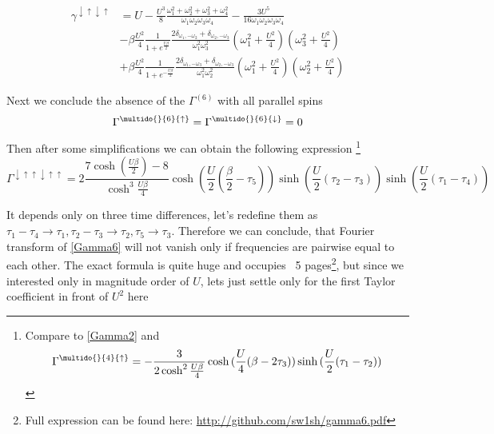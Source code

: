 \begin{equation}\begin{aligned}
 \gamma^{\downarrow\uparrow\downarrow\uparrow} & = 
 U - \frac{U^3}{8}\frac{\omega_1^2+\omega_2^2+\omega_3^2+\omega_4^2}{\omega_1\omega_2\omega_3\omega_4}
   - \frac{3U^5}{16\omega_1\omega_2\omega_3\omega_4} \\
  &- \beta\frac{U^2}{4}\frac{1}{1+e^{\frac{U\beta}{2}}}\frac{2\delta_{\omega_1,-\omega_2}+\delta_{\omega_2,-\omega_3}}{\omega_1^2\omega_3^2}(\omega_1^2+\frac{U^2}{4})(\omega_3^2+\frac{U^2}{4}) \\
  &+ \beta\frac{U^2}{4}\frac{1}{1+e^{-\frac{U\beta}{2}}}\frac{2\delta_{\omega_1,-\omega_3}+\delta_{\omega_2,-\omega_3}}{\omega_1^2\omega_2^2}(\omega_1^2+\frac{U^2}{4})(\omega_2^2+\frac{U^2}{4})   
\end{aligned}\end{equation}

Next we conclude the absence of the $\Gamma^{(6)}$ with all parallel spins
\begin{equation}
 \Gamma^{\multido{}{6}{\uparrow}} = \Gamma^{\multido{}{6}{\downarrow}} = 0
\end{equation}

Then after some simplifications we can obtain the following expression
\footnote{Compare to \eqref{Gamma2} and
\[
 \Gamma^{\multido{}{4}{\uparrow}} = -\frac{3}{2\cosh^2{\frac{U\beta}{4}}}\cosh{(\frac{U}{4}(\beta-2\tau_3))}\sinh{(\frac{U}{2}(\tau_1-\tau_2))}
\]
}
\begin{equation}
\label{Gamma6}
 \Gamma^{\downarrow\uparrow\uparrow\downarrow\uparrow\uparrow} = 
    2\frac{7\cosh{(\frac{U\beta}{2})-8}}{\cosh^3{\frac{U\beta}{4}}}\cosh{(\frac{U}{2}(\frac{\beta}{2}-\tau_5))}
      \sinh{(\frac{U}{2}(\tau_2-\tau_3))}\sinh{(\frac{U}{2}(\tau_1-\tau_4))}
\end{equation}

It depends only on three time differences, let's redefine them as $\tau_1-\tau_4\rightarrow\tau_1,\tau_2-\tau_3\rightarrow \tau_2,\tau_5\rightarrow\tau_3$.
Therefore we can conclude, that Fourier transform of \eqref{Gamma6} will not vanish only if frequencies are pairwise equal to each other.
The exact formula is quite huge and occupies ~5 pages\footnote{Full expression can be found here: \url{http://github.com/sw1sh/gamma6.pdf}},
 but since we interested only in magnitude order of $U$, lets just settle only for the first Taylor coefficient in front of $U^2$ here

